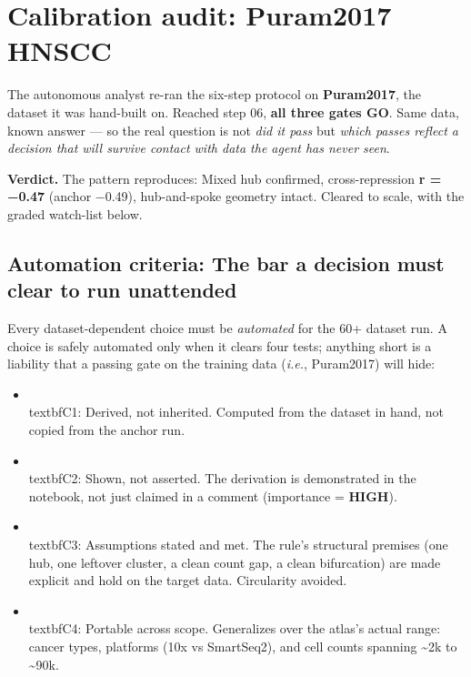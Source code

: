 \documentclass[11pt,a4paper]{article}
\providecommand{\tightlist}{\setlength{\itemsep}{0pt}\setlength{\parskip}{0pt}}
\begin{document}
\hypertarget{sec:2}{%
\section{Calibration audit: Puram2017 HNSCC}\label{sec:2}}

The autonomous analyst re-ran the six-step protocol on \textbf{Puram2017}, the dataset it was hand-built on. Reached step 06, \textbf{all
three gates GO}. Same data, known answer --- so the real question is not
\emph{did it pass} but \emph{which passes reflect a decision that will
survive contact with data the agent has never seen}.

\textbf{Verdict.} The pattern reproduces: Mixed hub confirmed,
cross-repression \textbf{r = −0.47} (anchor −0.49), hub-and-spoke
geometry intact. Cleared to scale, with the graded watch-list below.

\hypertarget{automation-criteria-the-bar-a-decision-must-clear-to-run-unattended}{%
\subsection{Automation criteria: The bar a decision must clear to run unattended}\label{automation-criteria-the-bar-a-decision-must-clear-to-run-unattended}}

Every dataset-dependent choice must be \emph{automated} for the 60+
dataset run. A choice is safely automated only when it clears four
tests; anything short is a liability that a passing gate on the training
data (\emph{i.e.}, Puram2017) will hide:

\begin{itemize}
\tightlist
\item
  \\textbf{C1: Derived, not inherited.} Computed from the dataset in
  hand, not copied from the anchor run.
\item
  \\textbf{C2: Shown, not asserted.} The derivation is demonstrated in
  the notebook, not just claimed in a comment (importance =
  \textbf{HIGH}).
\item
  \\textbf{C3: Assumptions stated and met.} The rule's structural
  premises (one hub, one leftover cluster, a clean count gap, a clean
  bifurcation) are made explicit and hold on the target data.
  Circularity avoided.
\item
  \\textbf{C4: Portable across scope.} Generalizes over the atlas's
  actual range: cancer types, platforms (10x vs SmartSeq2), and cell
  counts spanning \textasciitilde2k to \textasciitilde90k.
\end{itemize}
\end{document}
